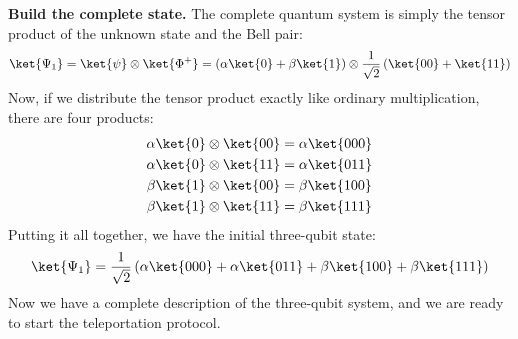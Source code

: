 \highspace
\textcolor{Green3}{ \textbf{Build the complete state.}} The complete quantum system is simply the tensor product of the unknown state and the Bell pair:
\begin{equation}\label{eq:initial-three-qubit-state}
    \ket{\Psi_1} = \ket{\psi} \otimes \ket{\Phi^+} = \left( \alpha \ket{0} + \beta \ket{1} \right) \otimes \frac{1}{\sqrt{2}} \left( \ket{00} + \ket{11} \right)
\end{equation}
Now, if we distribute the tensor product exactly like ordinary multiplication, there are four products:
\begin{align*}
    \alpha\ket{0} \otimes \ket{00} &= \alpha\ket{000} \\
    \alpha\ket{0} \otimes \ket{11} &= \alpha\ket{011} \\
    \beta\ket{1} \otimes \ket{00} &= \beta\ket{100} \\
    \beta\ket{1} \otimes \ket{11} &= \beta\ket{111}
\end{align*}
Putting it all together, we have the initial three-qubit state:
\begin{equation}\label{eq:initial-three-qubit-state-expanded}
    \ket{\Psi_1} = \frac{1}{\sqrt{2}} \left( \alpha\ket{000} + \alpha\ket{011} + \beta\ket{100} + \beta\ket{111} \right)
\end{equation}
Now we have a complete description of the three-qubit system, and we are ready to start the teleportation protocol.